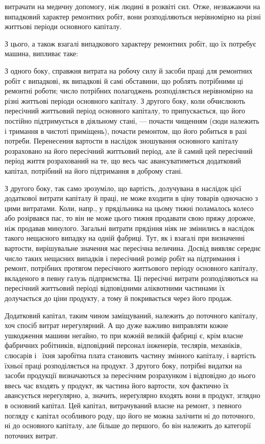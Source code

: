 \parcont{}  %
витрачати на медичну допомогу, ніж людині в розквіті сил. Отже, незважаючи на випадковий характер
ремонтних робіт, вони розподіляються нерівномірно на різні життьові періоди основного капіталу.

З цього, а також взагалі випадкового характеру ремонтних робіт, що їх потребує машина, випливає
таке:

З одного боку, справжня витрата на робочу силу й засоби праці для ремонтних робіт є випадкові, як
випадкові й самі обставини, що роблять потрібними ці ремонтні роботи; число потрібних полагоджень
розподіляється нерівномірно на різні життьові періоди основного капіталу. З другого боку, коли
обчислюють пересічний життьовий період основного капіталу, то припускається, що його постійно
підтримується в діяльному
стані, — почасти чищенням (сюди належить і тримання в чистоті приміщень), почасти ремонтом, що його
робиться в разі потреби. Перенесення вартости в наслідок зношування основного капіталу розраховано
на його пересічний життьовий період, але й самий цей пересічний період життя розрахований на те, що
весь час авансуватиметься додатковий капітал, потрібний на його підтримання в доброму стані.

З другого боку, так само зрозуміло, що вартість, долучувана в наслідок цієї додаткової витрати
капіталу й праці, не може входити в ціну товарів одночасно з цими витратами. Коли, напр., у
прядільника на цьому тижні поламалось колесо або розірвався пас, то він не може цього тижня
продавати свою пряжу дорожче, ніж продавав минулого. Загальні витрати прядіння ніяк не змінились в
наслідок такого нещасного випадку на одній фабриці. Тут, як і взагалі при визначенні вартости,
вирішувальне значення має пересічна величина. Досвід виявляє середнє число таких нещасних випадків і
пересічний розмір робіт на підтримання і ремонт, потрібних протягом пересічного життьового періоду
основного капіталу, вкладеного в певну галузь підприємства. Ці пересічні витрати розподіляються на
пересічний життьовий періоді відповідними аліквотними частинами їх долучається до ціни продукту, а
тому й покривається через його продаж.

Додатковий капітал, таким чином заміщуваний, належить до поточного капіталу, хоч спосіб витрат
нерегулярний. А що дуже важливо виправляти кожне ушкодження машини негайно, то при кожній великій
фабриці є, крім власне фабричних робітників, відповідний персонал інженерів, теслярів, механіків,
слюсарів і~ їхня заробітна плата становить частину змінного капіталу, і вартість їхньої праці
розподіляється на
продукт. З другого боку, потрібні видатки на засоби продукції визначаються за пересічним розрахунком
і відповідно до нього ввесь час входять у продукт, як частина його вартости, хоч фактично їх
авансується нереґулярно, а, значить, нереґулярно входять вони в продукт, зглядно в основний капітал.
Цей капітал, витрачуваний власне на ремонт, з певного погляду є капітал особливого роду, що його не
можна залічити ні до поточного, ні до основного капіталу, але більше до першого, бо він належить до
категорії поточних витрат.

